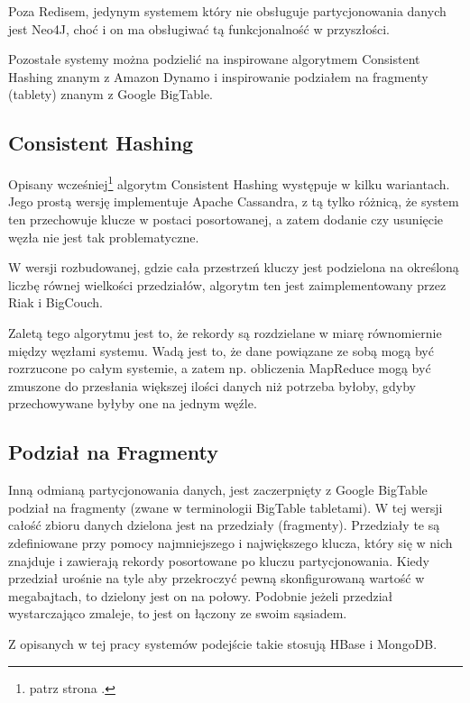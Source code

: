 Poza Redisem, jedynym systemem który nie obsługuje partycjonowania danych jest Neo4J, choć i on ma obsługiwać tą funkcjonalność w przyszłości.

Pozostałe systemy można podzielić na inspirowane algorytmem Consistent Hashing znanym z Amazon Dynamo i inspirowanie podziałem na fragmenty (tablety) znanym z Google BigTable.

\subsection*{Consistent Hashing}

Opisany wcześniej\footnote{patrz strona \pageref{sec:dynamo-consistent-hashing}.} algorytm Consistent Hashing występuje w kilku wariantach.
Jego prostą wersję implementuje Apache Cassandra, z tą tylko różnicą, że system ten przechowuje klucze w postaci posortowanej, a zatem dodanie czy usunięcie węzła nie jest tak problematyczne.

W wersji rozbudowanej, gdzie cała przestrzeń kluczy jest podzielona na określoną liczbę równej wielkości przedziałów, algorytm ten jest zaimplementowany przez Riak i BigCouch.

Zaletą tego algorytmu jest to, że rekordy są rozdzielane w miarę równomiernie między węzłami systemu.
Wadą jest to, że dane powiązane ze sobą mogą być rozrzucone po całym systemie, a zatem np. obliczenia MapReduce mogą być zmuszone do przesłania większej ilości danych niż potrzeba byłoby, gdyby przechowywane byłyby one na jednym węźle.

\subsection*{Podział na Fragmenty}

Inną odmianą partycjonowania danych, jest zaczerpnięty z Google BigTable podział na fragmenty (zwane w terminologii BigTable tabletami).
W tej wersji całość zbioru danych dzielona jest na przedziały (fragmenty).
Przedziały te są zdefiniowane przy pomocy najmniejszego i największego klucza, który się w nich znajduje i zawierają rekordy posortowane po kluczu partycjonowania.
Kiedy przedział urośnie na tyle aby przekroczyć pewną skonfigurowaną wartość w megabajtach, to dzielony jest on na połowy.
Podobnie jeżeli przedział wystarczająco zmaleje, to jest on łączony ze swoim sąsiadem.

Z opisanych w tej pracy systemów podejście takie stosują HBase i MongoDB.

